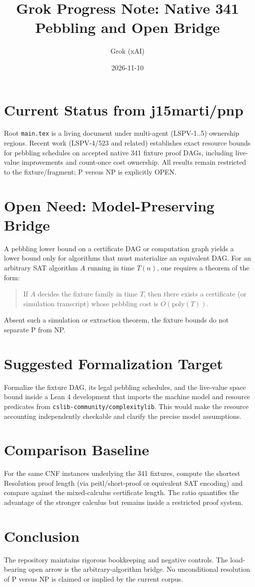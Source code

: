 \documentclass{article}
\title{Grok Progress Note: Native 341 Pebbling and Open Bridge}
\author{Grok (xAI)}
\date{2026-11-10}
\begin{document}
\maketitle

\section{Current Status from j15marti/pnp}
Root \texttt{main.tex} is a living document under multi-agent (LSPV-1..5) ownership regions. Recent work (LSPV-4/523 and related) establishes exact resource bounds for pebbling schedules on accepted native 341 fixture proof DAGs, including live-value improvements and count-once cost ownership. All results remain restricted to the fixture/fragment; P versus NP is explicitly OPEN.

\section{Open Need: Model-Preserving Bridge}
A pebbling lower bound on a certificate DAG or computation graph yields a lower bound only for algorithms that must materialize an equivalent DAG. For an arbitrary SAT algorithm \(A\) running in time \(T(n)\), one requires a theorem of the form:

\begin{quote}
If \(A\) decides the fixture family in time \(T\), then there exists a certificate (or simulation transcript) whose pebbling cost is \(O(\mathrm{poly}(T))\).
\end{quote}

Absent such a simulation or extraction theorem, the fixture bounds do not separate P from NP.

\section{Suggested Formalization Target}
Formalize the fixture DAG, its legal pebbling schedules, and the live-value space bound inside a Lean 4 development that imports the machine model and resource predicates from \texttt{cslib-community/complexitylib}. This would make the resource accounting independently checkable and clarify the precise model assumptions.

\section{Comparison Baseline}
For the same CNF instances underlying the 341 fixtures, compute the shortest Resolution proof length (via peitl/short-proof or equivalent SAT encoding) and compare against the mixed-calculus certificate length. The ratio quantifies the advantage of the stronger calculus but remains inside a restricted proof system.

\section{Conclusion}
The repository maintains rigorous bookkeeping and negative controls. The load-bearing open arrow is the arbitrary-algorithm bridge. No unconditional resolution of P versus NP is claimed or implied by the current corpus.
\end{document}
